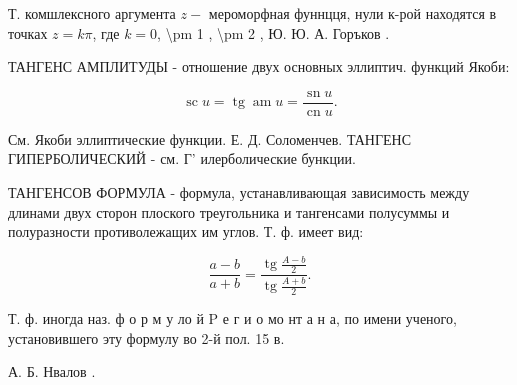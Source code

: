 \documentclass[10pt]{article}
\begin{document}
Т. комшлексного аргумента $z-$ мероморфная фуннцця, нули к-рой находятся в точках $z=k \pi$, где $k=0$, \textbackslash pm 1 , \textbackslash pm 2 , Ю. Ю. А. Горъков .



ТАНГЕНС АМПЛИТУДЫ - отношение двух основных эллиптич. функций Якоби:



\[

\operatorname{sc} u=\operatorname{tg} \operatorname{am} u=\frac{\operatorname{sn} u}{\operatorname{cn} u} .

\]



См. Якоби эллиптические функции. Е. Д. Соломенчев. ТАНГЕНС ГИПЕРБОЛИЧЕСКИЙ - см. Г' илерболические бункции.



ТАНГЕНСОВ ФОРМУЛА - формула, устанавливающая зависимость между длинами двух сторон плоского треугольника и тангенсами полусуммы и полуразности противолежащих им углов. Т. ф. имеет вид:



\[

\frac{a-b}{a+b}=\frac{\operatorname{tg} \frac{A-b}{2}}{\operatorname{tg} \frac{A+b}{2}} .

\]



Т. ф. иногда наз. ф о р м у ло й $\mathrm{P}$ е г и о мо нт а н а, по имени ученого, установившего эту формулу во 2-й пол. 15 в.



А. Б. Нвалов .
\end{document}
